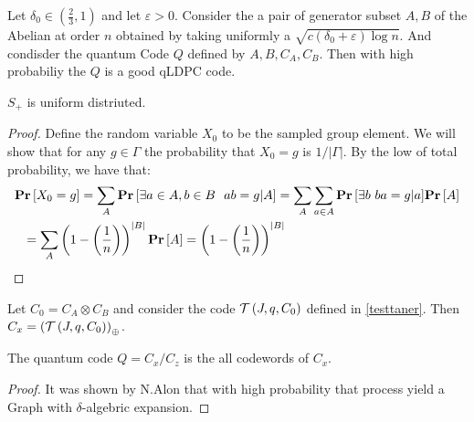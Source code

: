 \begin{theorem*} 
Let $\delta_{0} \in \left( \frac{2}{3} ,1 \right)$ and let $\varepsilon > 0$. Consider the a pair of generator subset $A,B$ of the Abelian at order $n$ obtained by taking uniformly a $ \sqrt{ c\left( \delta_{0} + \varepsilon \right)\log n }$. And condisder the quantum Code $Q$ defined by $A,B,C_{A},C_{B}$.  Then with high probabiliy the $Q$ is a good qLDPC code.
\end{theorem*}
\begin{claim} \label{unif}
  $S_{+}$ is uniform distriuted. 
\end{claim}
\begin{proof}
  Define the random variable $X_{0}$ to be the sampled group element. We will show that for any $g \in \Gamma $ the probability that $X_{0} = g$ is $1/|\Gamma|$. By the low of total probability, we have that:     
  \begin{equation*}
    \begin{split}
      & \prb{X_{0} = g} = \sum_{A}{ \prb{ \exists a \in A, b \in B \ \ ab = g | A } } = \sum_{A}{ \sum_{a\in A} {\prb{ \exists b \  ba= g | a } } \prb{ A }  } \\ 
      & \ \ =  \sum_{A}{  \left( 1 -   \left( \frac{1}{n} \right) \right)^{|B|}   \prb{ A }  } =  \left( 1 -   \left( \frac{1}{n} \right) \right)^{|B|} 
    \end{split}
  \end{equation*}
\end{proof}
\begin{claim}
  Let $C_{0} = C_{A}\otimes C_{B}$ and consider the code $\mathcal{T}\left(J, q , C_{0}\right)$ defined in \ref{testtaner}. Then $C_{x} = \left( \mathcal{T}\left(J, q , C_{0}\right) \right)_{\oplus}$. 
\end{claim}
\begin{claim}
  The quantum code $Q = C_{x}/ C_{z}$ is the all \ireducable codewords of $C_{x}$.   
\end{claim}
\begin{proof}
  It was shown by N.Alon \cite{Noga}  that with high probability that process yield a Graph with $\delta$-algebric expansion.
  \end{proof}
